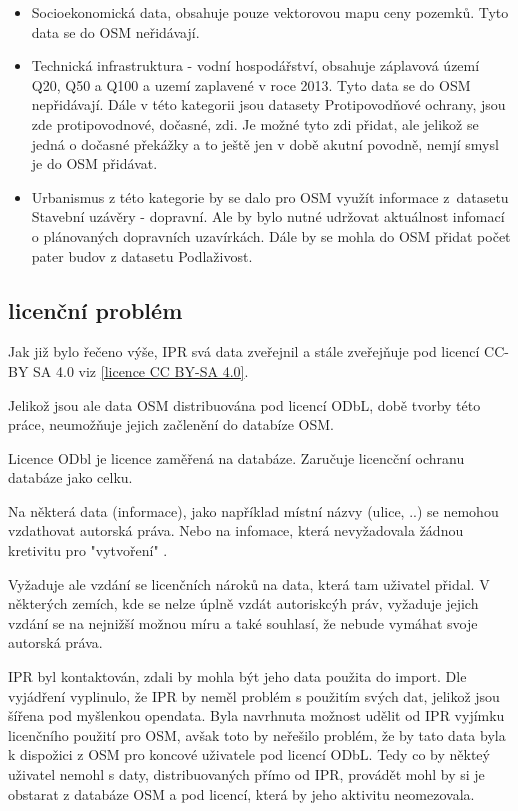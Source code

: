 \begin{itemize}
    \item   Socioekonomická data, obsahuje pouze vektorovou mapu ceny pozemků.
            Tyto data se do OSM neřidávají.

    \item   Technická infrastruktura - vodní hospodářství, obsahuje záplavová území
            Q20, Q50 a Q100 a uzemí zaplavené v roce 2013. Tyto data se do OSM
            nepřidávají. Dále v této kategorii jsou datasety Protipovodňové ochrany,
            jsou zde protipovodnové, dočasné, zdi. Je možné tyto zdi přidat,
            ale jelikož se jedná o dočasné překážky a to ještě jen v době akutní povodně,
            nemjí smysl je do OSM přidávat.

    \item   Urbanismus z této kategorie by se dalo pro OSM využít informace
            z~datasetu Stavební uzávěry - dopravní. Ale by bylo nutné udržovat
            aktuálnost infomací o plánovaných dopravních uzavírkách.
            Dále by se mohla do OSM přidat počet pater budov z datasetu
            Podlaživost.
\end{itemize}


\subsection{licenční problém}
\label{licenční problém}
Jak již bylo řečeno výše, IPR svá data zveřejnil a stále zveřejňuje pod licencí CC-BY SA 4.0 viz \ref{licence CC BY-SA 4.0}.

Jelikož jsou ale data OSM distribuována pod licencí ODbL,
době tvorby této práce, neumožňuje jejich začlenění do databíze OSM.

Licence ODbl je licence zaměřená na databáze. Zaručuje licencční 
ochranu databáze jako celku. 

Na některá data (informace), jako například místní názvy (ulice, ..)
se nemohou vzdathovat autorská práva. Nebo na infomace, která 
nevyžadovala žádnou kretivitu pro "vytvoření" . 

Vyžaduje ale vzdání se licenčních nároků 
na data, která tam uživatel přidal. V některých zemích, kde se nelze 
úplně vzdát autoriskcýh práv, vyžaduje jejich vzdání se na nejnižší 
možnou míru a také souhlasí, že nebude vymáhat svoje autorská práva.
\cite{ODbl}

IPR byl kontaktován, zdali by mohla být jeho data použita do import.
Dle vyjádření vyplinulo, že IPR by neměl problém s použitím svých dat, jelikož
jsou šířena pod myšlenkou opendata. Byla navrhnuta možnost udělit od IPR vyjímku
licenčního použití pro OSM, avšak toto by neřešilo problém, že by tato data byla
k dispožici z OSM pro koncové uživatele pod licencí ODbL. Tedy co by někteý
uživatel nemohl s daty, distribuovaných přímo od IPR, provádět mohl by si je
obstarat z databáze OSM a pod licencí, která by jeho aktivitu neomezovala.

